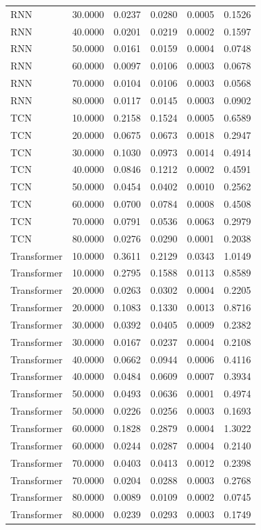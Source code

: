 \begin{tabular}{lrrrrr}
RNN & 30.0000 & 0.0237 & 0.0280 & 0.0005 & 0.1526 \\
RNN & 40.0000 & 0.0201 & 0.0219 & 0.0002 & 0.1597 \\
RNN & 50.0000 & 0.0161 & 0.0159 & 0.0004 & 0.0748 \\
RNN & 60.0000 & 0.0097 & 0.0106 & 0.0003 & 0.0678 \\
RNN & 70.0000 & 0.0104 & 0.0106 & 0.0003 & 0.0568 \\
RNN & 80.0000 & 0.0117 & 0.0145 & 0.0003 & 0.0902 \\
TCN & 10.0000 & 0.2158 & 0.1524 & 0.0005 & 0.6589 \\
TCN & 20.0000 & 0.0675 & 0.0673 & 0.0018 & 0.2947 \\
TCN & 30.0000 & 0.1030 & 0.0973 & 0.0014 & 0.4914 \\
TCN & 40.0000 & 0.0846 & 0.1212 & 0.0002 & 0.4591 \\
TCN & 50.0000 & 0.0454 & 0.0402 & 0.0010 & 0.2562 \\
TCN & 60.0000 & 0.0700 & 0.0784 & 0.0008 & 0.4508 \\
TCN & 70.0000 & 0.0791 & 0.0536 & 0.0063 & 0.2979 \\
TCN & 80.0000 & 0.0276 & 0.0290 & 0.0001 & 0.2038 \\
Transformer & 10.0000 & 0.3611 & 0.2129 & 0.0343 & 1.0149 \\
Transformer & 10.0000 & 0.2795 & 0.1588 & 0.0113 & 0.8589 \\
Transformer & 20.0000 & 0.0263 & 0.0302 & 0.0004 & 0.2205 \\
Transformer & 20.0000 & 0.1083 & 0.1330 & 0.0013 & 0.8716 \\
Transformer & 30.0000 & 0.0392 & 0.0405 & 0.0009 & 0.2382 \\
Transformer & 30.0000 & 0.0167 & 0.0237 & 0.0004 & 0.2108 \\
Transformer & 40.0000 & 0.0662 & 0.0944 & 0.0006 & 0.4116 \\
Transformer & 40.0000 & 0.0484 & 0.0609 & 0.0007 & 0.3934 \\
Transformer & 50.0000 & 0.0493 & 0.0636 & 0.0001 & 0.4974 \\
Transformer & 50.0000 & 0.0226 & 0.0256 & 0.0003 & 0.1693 \\
Transformer & 60.0000 & 0.1828 & 0.2879 & 0.0004 & 1.3022 \\
Transformer & 60.0000 & 0.0244 & 0.0287 & 0.0004 & 0.2140 \\
Transformer & 70.0000 & 0.0403 & 0.0413 & 0.0012 & 0.2398 \\
Transformer & 70.0000 & 0.0204 & 0.0288 & 0.0003 & 0.2768 \\
Transformer & 80.0000 & 0.0089 & 0.0109 & 0.0002 & 0.0745 \\
Transformer & 80.0000 & 0.0239 & 0.0293 & 0.0003 & 0.1749 \\
\bottomrule
\end{tabular}
